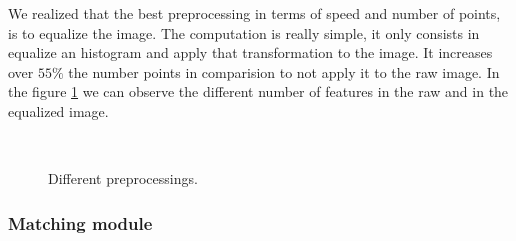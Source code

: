 We realized that the best preprocessing in terms of speed and number of points, is to equalize the image. The computation is really simple, it only consists in equalize an histogram and apply that transformation to the image. It increases over $ 55 \%$ the number points in comparision to not apply it to the raw image. In the figure \ref{prepoes} we can observe the different number of features in the raw and in the equalized image.

\begin{figure}[H]
		
\centering

\\
\caption{Different preprocessings.}
\label{prepoes}
\end{figure}


\subsubsection{Matching module}


